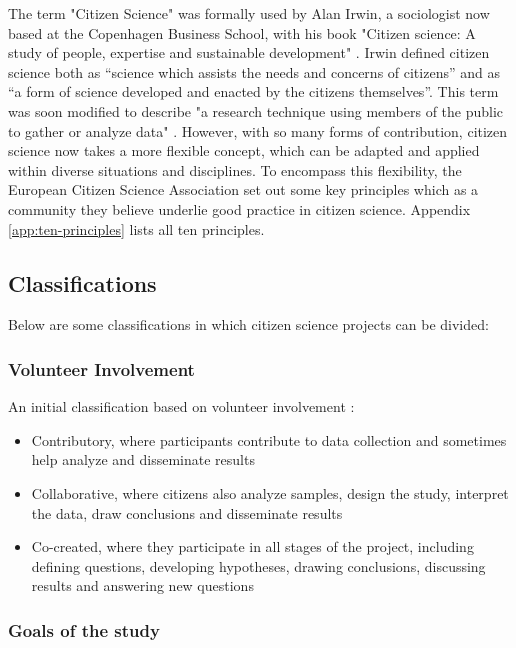 The term "Citizen Science" was formally used by Alan Irwin, a sociologist now based at the Copenhagen Business School, with his book "Citizen science: A study of people, expertise and sustainable development" \cite{irwin1995citizen}. Irwin defined citizen science both as “science which assists the needs and concerns of citizens” and as “a form of science developed and enacted by the citizens themselves”. This term was soon modified to describe "a research technique using members of the public to gather or analyze data" \cite{bonney2009citizen}. However, with so many forms of contribution, citizen science now takes a more flexible concept, which can be adapted and applied within diverse situations and disciplines. To encompass this flexibility, the European Citizen Science Association \cite{robinson2018ten} set out some key principles which as a community they believe underlie good practice in citizen science. Appendix \ref{app:ten-principles} lists all ten principles.

\subsection{Classifications}

Below are some classifications in which citizen science projects can be divided:

\subsubsection{Volunteer Involvement}

An initial classification based on volunteer involvement \cite{follett2015analysis}: 
\begin{itemize}
    \item Contributory, where participants contribute to data collection and sometimes help analyze and disseminate results
    \item Collaborative, where citizens also analyze samples, design the study, interpret the data, draw conclusions and disseminate results
    \item Co-created, where they participate in all stages of the project, including defining questions, developing hypotheses, drawing conclusions, discussing results and answering new questions
\end{itemize}

\subsubsection{Goals of the study}

